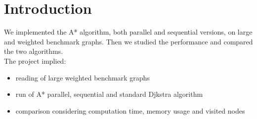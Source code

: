 \section{Introduction}
\label{Sec:intro}

We implemented the A* algorithm, both parallel and sequential versions, on large and weighted benchmark graphs.
Then we studied the performance and compared the two algorithms.
\\
The project implied:
\begin{itemize}
    \item reading of large weighted benchmark graphs
    \item run of A* parallel, sequential and standard Djkstra algorithm
    \item comparison considering computation time, memory usage and visited nodes
\end{itemize}